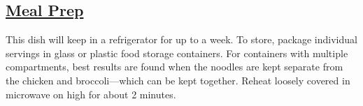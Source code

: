 \begin{minipage}{\textwidth}
\begin{vwcol}[widths={0.6,0.4}, rule=0pt]
\begin{minipage}{0.3\linewidth}
\section*{\underline{Meal Prep}}
This dish will keep in a refrigerator for up to a week. To store, package individual servings in glass or plastic food storage containers. For containers with multiple compartments, best results are found when the noodles are kept separate from the chicken and broccoli---which can be kept together. Reheat loosely covered in microwave on high for about 2 minutes.
\end{minipage}
\end{vwcol}
\end{minipage}


